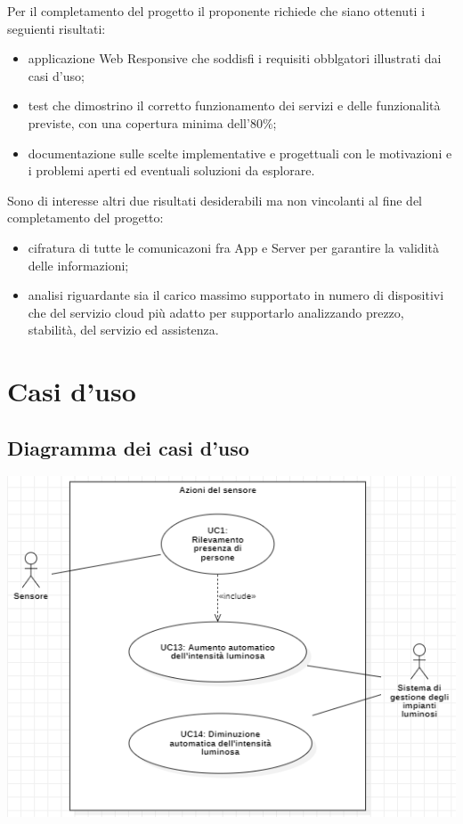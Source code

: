 \documentclass[a4paper, 12pt]{article}
\begin{document}
Per il completamento del progetto il proponente richiede che siano ottenuti i
seguienti risultati:
\begin{itemize}
    \item applicazione Web Responsive che soddisfi i requisiti obblgatori
    illustrati dai casi d'uso;
    \item test che dimostrino il corretto funzionamento dei servizi e delle
    funzionalità previste, con una copertura minima dell'80\%;
    \item documentazione sulle scelte implementative e progettuali con le
    motivazioni e i problemi aperti ed eventuali soluzioni da esplorare.
\end{itemize}
Sono di interesse altri due risultati desiderabili ma non vincolanti al fine del
completamento del progetto:
\begin{itemize}
    \item cifratura di tutte le comunicazoni fra App e Server per garantire la
    validità delle informazioni;
    \item analisi riguardante sia il carico massimo supportato in numero di
    dispositivi che del servizio cloud più adatto per supportarlo
    analizzando prezzo, stabilità, del servizio ed assistenza.
\end{itemize} 
\newpage
\section{Casi d'uso}

\subsection{Diagramma dei casi d'uso}

\includegraphics[scale=0.7]{diagramma_use_case_1.PNG}
\end{document}
